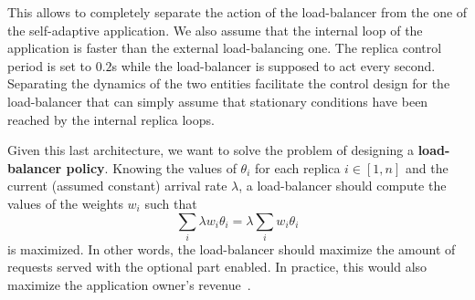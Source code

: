 This allows to completely separate the action of the load-balancer
from the one of the self-adaptive application. We also assume that the
internal loop of the application is faster than the external
load-balancing one. The replica control period is set to $0.2$s while
the load-balancer is supposed to act every second. Separating the
dynamics of the two entities facilitate the control design for the
load-balancer that can simply assume that stationary conditions have
been reached by the internal replica loops.

Given this last architecture, we want to solve the problem of
designing a {\bf load-balancer policy}. Knowing the values of
$\theta_i$ for each replica $i \in [1, n]$ and the current (assumed
constant) arrival rate $\lambda$, a load-balancer should compute the
values of the weights $w_i$ such that
\begin{equation}
\sum_{i} \lambda w_i \theta_i = \lambda \sum_i w_i \theta_i
\label{eq:objective}
\end{equation}
is maximized. In other words, the load-balancer should maximize the
amount of requests served with the optional part enabled. In practice,
this would also maximize the application owner's
revenue~\cite{cloudish-tr}.
